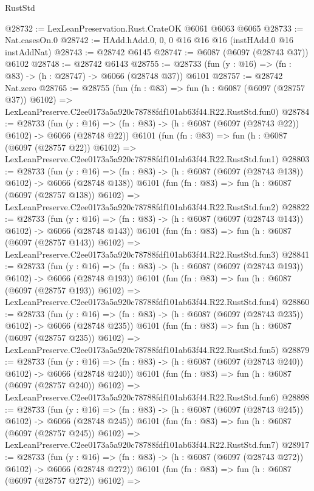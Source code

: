 \begin{lexlean}{RustStd}
\begin{coremodule}
@28732 := LexLeanPreservation.Rust.CrateOK @6061 @6063 @6065
@28733 := Nat.casesOn.{0}
@28742 := HAdd.hAdd.{0, 0, 0} @16 @16 @16 (instHAdd.{0} @16 instAddNat)
@28743 := @28742 @6145
@28747 := @6087 (@6097 (@28743 @37)) @6102
@28748 := @28742 @6143
@28755 := @28733 (fun (y : @16) => (fn : @83) -> (h : @28747) -> @6066 (@28748 @37)) @6101
@28757 := @28742 Nat.zero
@28765 := @28755
    (fun (fn : @83) =>
    fun (h : @6087 (@6097 (@28757 @37)) @6102) =>
    LexLeanPreserve.C2ee0173a5a920c78788fdf101ab63f44.R22.RustStd.fun0)
@28784 := @28733
    (fun (y : @16) => (fn : @83) -> (h : @6087 (@6097 (@28743 @22)) @6102) -> @6066 (@28748 @22))
    @6101
    (fun (fn : @83) =>
    fun (h : @6087 (@6097 (@28757 @22)) @6102) =>
    LexLeanPreserve.C2ee0173a5a920c78788fdf101ab63f44.R22.RustStd.fun1)
@28803 := @28733
    (fun (y : @16) => (fn : @83) -> (h : @6087 (@6097 (@28743 @138)) @6102) -> @6066 (@28748 @138))
    @6101
    (fun (fn : @83) =>
    fun (h : @6087 (@6097 (@28757 @138)) @6102) =>
    LexLeanPreserve.C2ee0173a5a920c78788fdf101ab63f44.R22.RustStd.fun2)
@28822 := @28733
    (fun (y : @16) => (fn : @83) -> (h : @6087 (@6097 (@28743 @143)) @6102) -> @6066 (@28748 @143))
    @6101
    (fun (fn : @83) =>
    fun (h : @6087 (@6097 (@28757 @143)) @6102) =>
    LexLeanPreserve.C2ee0173a5a920c78788fdf101ab63f44.R22.RustStd.fun3)
@28841 := @28733
    (fun (y : @16) => (fn : @83) -> (h : @6087 (@6097 (@28743 @193)) @6102) -> @6066 (@28748 @193))
    @6101
    (fun (fn : @83) =>
    fun (h : @6087 (@6097 (@28757 @193)) @6102) =>
    LexLeanPreserve.C2ee0173a5a920c78788fdf101ab63f44.R22.RustStd.fun4)
@28860 := @28733
    (fun (y : @16) => (fn : @83) -> (h : @6087 (@6097 (@28743 @235)) @6102) -> @6066 (@28748 @235))
    @6101
    (fun (fn : @83) =>
    fun (h : @6087 (@6097 (@28757 @235)) @6102) =>
    LexLeanPreserve.C2ee0173a5a920c78788fdf101ab63f44.R22.RustStd.fun5)
@28879 := @28733
    (fun (y : @16) => (fn : @83) -> (h : @6087 (@6097 (@28743 @240)) @6102) -> @6066 (@28748 @240))
    @6101
    (fun (fn : @83) =>
    fun (h : @6087 (@6097 (@28757 @240)) @6102) =>
    LexLeanPreserve.C2ee0173a5a920c78788fdf101ab63f44.R22.RustStd.fun6)
@28898 := @28733
    (fun (y : @16) => (fn : @83) -> (h : @6087 (@6097 (@28743 @245)) @6102) -> @6066 (@28748 @245))
    @6101
    (fun (fn : @83) =>
    fun (h : @6087 (@6097 (@28757 @245)) @6102) =>
    LexLeanPreserve.C2ee0173a5a920c78788fdf101ab63f44.R22.RustStd.fun7)
@28917 := @28733
    (fun (y : @16) => (fn : @83) -> (h : @6087 (@6097 (@28743 @272)) @6102) -> @6066 (@28748 @272))
    @6101
    (fun (fn : @83) =>
    fun (h : @6087 (@6097 (@28757 @272)) @6102) =>

\end{coremodule}
\end{lexlean}
